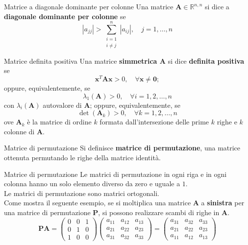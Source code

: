 \begin{definition}{Matrice a diagonale dominante per colonne}
    Una matrice $\mathbf{A}\in\mathbb{R}^{n,n}$ si dice a \textbf{diagonale dominante per colonne} se
    \[\left|a_{jj}\right|>\sum_{\substack{i=1\\i\ne j}}^n\left|a_{ij}\right|,\quad j=1,\dots,n\]
\end{definition}

\begin{definition}{Matrice definita positiva}
    Una matrice \textbf{simmetrica $\mathbf{A}$} si dice \textbf{definita positiva} se
    \[\mathbf{x}^T\mathbf{Ax}>0,\quad\forall \mathbf{x}\ne\mathbf{0};\]
    oppure, equivalentemente, se
    \[\lambda_1(\mathbf{A})>0,\quad\forall i=1,2,\dots,n\]
    con $\lambda_i(\mathbf{A})$ autovalore di $\mathbf{A}$; oppure, equivalentemente, se
    \[\det(\mathbf{A}_k)>0,\quad\forall k=1,2,\dots,n\]
    ove $\mathbf{A}_k$ è la matrice di ordine $k$ formata dall'intersezione delle prime $k$ righe e
    $k$ colonne di $\mathbf{A}$.
\end{definition}

\begin{definition}{Matrice di permutazione}
    Si definisce \textbf{matrice di permutazione}, una matrice ottenuta permutando le righe della matrice identità.
\end{definition}

\begin{observation}{Matrice di permutazione}
    Le matrici di permutazione in ogni riga e in ogni colonna hanno un solo elemento diverso da zero e uguale a $1$.\\
    Le matrici di permutazione sono matrici ortogonali.\\
    Come mostra il seguente esempio, se si moltiplica una matrice $\mathbf{A}$ a \textbf{sinistra}
    per una matrice di permutazione $\mathbf{P}$, si possono realizzare scambi di righe in $\mathbf{A}$.
    \[\mathbf{PA} = \left(
        \begin{matrix}
            0 & 0 & 1 \\
            0 & 1 & 0 \\
            1 & 0 & 0
        \end{matrix}
    \right)\left(
        \begin{matrix}
            a_{11} & a_{12} & a_{13} \\
            a_{21} & a_{22} & a_{23} \\
            a_{31} & a_{32} & a_{33}
        \end{matrix}
    \right)=\left(
        \begin{matrix}
            a_{31} & a_{32} & a_{33} \\
            a_{21} & a_{22} & a_{23} \\
            a_{11} & a_{12} & a_{13}
        \end{matrix}
    \right)\]
\end{observation}\vfill

